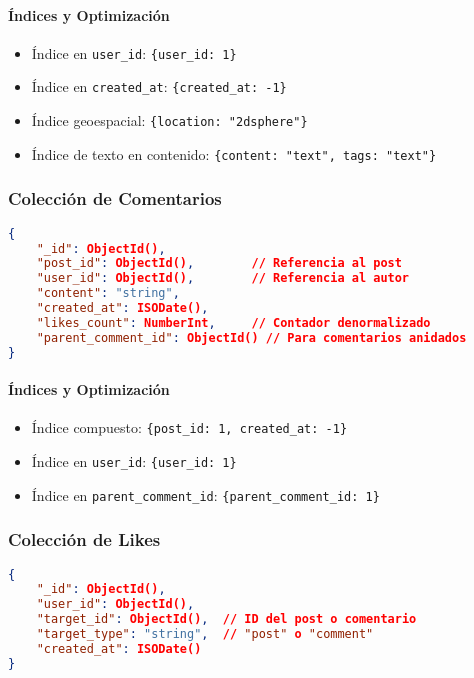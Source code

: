 \documentclass[12pt,letterpaper]{article}
\begin{document}
\paragraph{Índices y Optimización}
\begin{itemize}
    \item Índice en \texttt{user\_id}: \texttt{\{user\_id: 1\}}
    \item Índice en \texttt{created\_at}: \texttt{\{created\_at: -1\}}
    \item Índice geoespacial: \texttt{\{location: "2dsphere"\}}
    \item Índice de texto en contenido: \texttt{\{content: "text", tags: "text"\}}
\end{itemize}

\subsubsection{Colección de Comentarios}
\begin{lstlisting}[language=json]
{
    "_id": ObjectId(),
    "post_id": ObjectId(),        // Referencia al post
    "user_id": ObjectId(),        // Referencia al autor
    "content": "string",
    "created_at": ISODate(),
    "likes_count": NumberInt,     // Contador denormalizado
    "parent_comment_id": ObjectId() // Para comentarios anidados
}
\end{lstlisting}

\paragraph{Índices y Optimización}
\begin{itemize}
    \item Índice compuesto: \texttt{\{post\_id: 1, created\_at: -1\}}
    \item Índice en \texttt{user\_id}: \texttt{\{user\_id: 1\}}
    \item Índice en \texttt{parent\_comment\_id}: \texttt{\{parent\_comment\_id: 1\}}
\end{itemize}

\subsubsection{Colección de Likes}
\begin{lstlisting}[language=json]
{
    "_id": ObjectId(),
    "user_id": ObjectId(),
    "target_id": ObjectId(),  // ID del post o comentario
    "target_type": "string",  // "post" o "comment"
    "created_at": ISODate()
}
\end{lstlisting}
\end{document}
